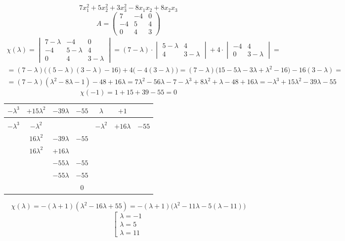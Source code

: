 $$ 7x_1^2 + 5x_2^2 + 3x_3^2 - 8x_1x_2 + 8x_2x_3 $$
$$ A =
\begin{pmatrix}
    7 & -4 & 0 \\
    -4 & 5 & 4 \\
    0 & 4 & 3
\end{pmatrix} $$
\begin{multline*}
    \chi(\lambda) =
    \begin{vmatrix}
        7 - \lambda & -4 & 0 \\
        -4 & 5 - \lambda & 4 \\
        0 & 4 & 3 - \lambda
    \end{vmatrix} = (7 - \lambda) \cdot
    \begin{vmatrix}
        5 - \lambda & 4 \\
        4 & 3 - \lambda
    \end{vmatrix} + 4 \cdot
    \begin{vmatrix}
        -4 & 4 \\
        0 & 3 - \lambda
    \end{vmatrix} = \\
    = (7 - \lambda) \bigg( (5 - \lambda)(3 - \lambda) - 16 \bigg) + 4 \bigg( -4(3 - \lambda) \bigg) = (7 - \lambda) \bigg( 15 - 5\lambda - 3\lambda + \lambda^2 - 16 \bigg) - 16(3 - \lambda) = \\
    = (7 - \lambda)(\lambda^2 - 8\lambda - 1) - 48 + 16\lambda = 7\lambda^2 - 56\lambda - 7 - \lambda^3 + 8\lambda^2 + \lambda - 48 + 16\lambda = -\lambda^3 + 15\lambda^2 - 39\lambda - 55
\end{multline*}
$$ \chi(-1) = 1 + 15 + 39 - 55 = 0 $$
\begin{tabular}{c c c c | c c c}
	$ -\lambda^3 $ & $ + 15\lambda^2 $ & $ - 39\lambda $ & $ - 55 $ & $ \lambda $ & $ + 1 $ \\
    \hline \\
    $ -\lambda^3 $ & $ -\lambda^2 $ & & & $ -\lambda^2 $ & $ +16\lambda $ & $ -55 $ \\
    & $ 16\lambda^2 $ & $ -39\lambda $ & $ -55 $ \\
    & $ 16\lambda^2 $ & $ +16\lambda $ & \\
    & & $ -55\lambda $ & $ -55 $ \\
    & & $ -55\lambda $ & $ -55 $ \\
    & & & $ 0 $
\end{tabular}
$$ \chi(\lambda) = -(\lambda + 1)(\lambda^2 - 16\lambda + 55) = -(\lambda + 1) \bigg( \lambda^2 - 11\lambda - 5(\lambda - 11) \bigg) $$
$$ \left[
\begin{aligned}
	\lambda = -1 \\
    \lambda = 5 \\
    \lambda = 11
\end{aligned} \right. $$
